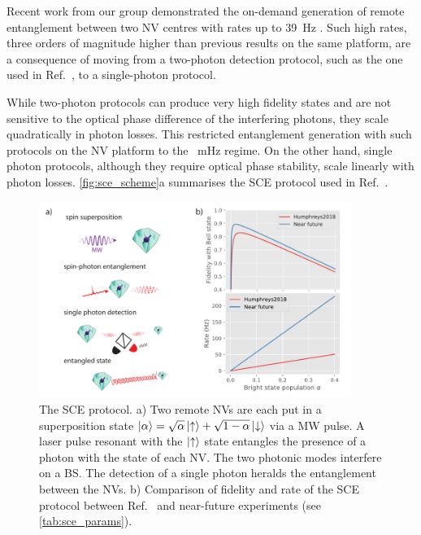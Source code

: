 \documentclass[a4paper]{article}
\begin{document}
Recent work from our group demonstrated the on-demand generation of remote entanglement between two \ac{NV} centres with rates up to \SI{39}{\Hz} \cite{Humphreys2018}. Such high rates, three orders of magnitude higher than previous results on the same platform, are a consequence of moving from a two-photon detection protocol, such as the one used in Ref.~\cite{Hensen2015}, to a single-photon protocol.

While two-photon protocols can produce very high fidelity states and are not sensitive to the optical phase difference of the interfering photons, they scale quadratically in photon losses. This restricted entanglement generation with such protocols on the \ac{NV} platform to the \SI{}{mHz} regime. 
On the other hand, single photon protocols, although they require optical phase stability, scale linearly with photon losses. \autoref{fig:sce_scheme}a summarises the \ac{SCE} protocol used in Ref.~\cite{Humphreys2018}.

\begin{figure}[h]
	\centering
	\includegraphics[width=0.9\textwidth]{images/figure2}
	\caption{The \acf{SCE} protocol.
	a) Two remote \acp{NV} are each put in a superposition state $\ket\alpha = \sqrt\alpha\ket\uparrow + \sqrt{1-\alpha}\ket\downarrow$ via a \ac{MW} pulse.
	A laser pulse resonant with the $\ket\uparrow$ state entangles the presence of a photon with the state of each \ac{NV}.
	The two photonic modes interfere on a \ac{BS}.
	The detection of a single photon heralds the entanglement between the \acp{NV}.
	b) Comparison of fidelity and rate of the \ac{SCE} protocol between Ref.~\cite{Humphreys2018} and near-future experiments (see \autoref{tab:sce_params}).}
	\label{fig:sce_scheme}
\end{figure}
\end{document}

